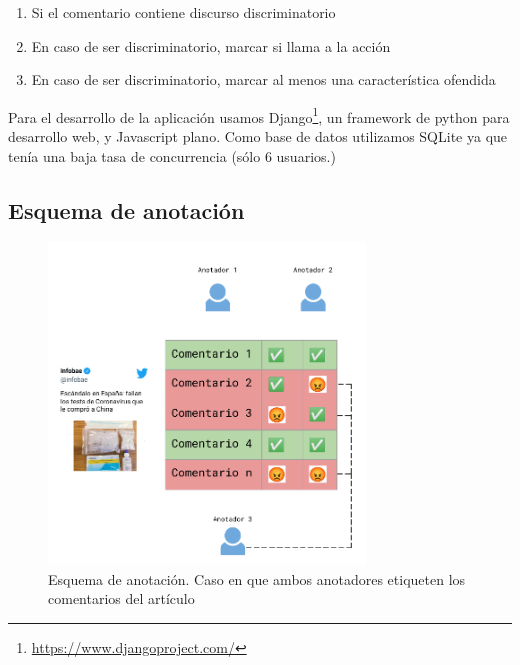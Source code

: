 \begin{enumerate}
    \item Si el comentario contiene discurso discriminatorio
    \item En caso de ser discriminatorio, marcar si llama a la acción
    \item En caso de ser discriminatorio, marcar al menos una característica ofendida
\end{enumerate}

Para el desarrollo de la aplicación usamos Django\footnote{\url{https://www.djangoproject.com/}}, un framework de python para desarrollo web, y Javascript plano. Como base de datos utilizamos SQLite ya que tenía una baja tasa de concurrencia (sólo 6 usuarios.)

\subsection{Esquema de anotación}



\begin{figure}
    \centering
    \includegraphics[width=0.75\textwidth]{img/esquema_anotacion.pdf}
    \caption{Esquema de anotación. Caso en que ambos anotadores etiqueten los comentarios del artículo}
    \label{fig:annotation_schema}
\end{figure}

